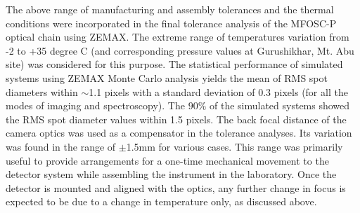 The above range of manufacturing and assembly tolerances and the thermal conditions were incorporated in the final tolerance analysis of the MFOSC-P optical chain using ZEMAX. The extreme range of temperatures variation from -2 to +35 degree C (and corresponding pressure values at Gurushikhar, Mt. Abu site) was considered for this purpose. The statistical performance of simulated systems using ZEMAX Monte Carlo analysis yields the mean of RMS spot diameters within $\sim$1.1 pixels with a standard deviation of 0.3 pixels (for all the modes of imaging and spectroscopy). The $90\%$ of the simulated systems showed the RMS spot diameter values within 1.5 pixels.  The back focal distance of the camera optics was used as a compensator in the tolerance analyses. Its variation was found in the range of $\pm$1.5mm for various cases. This range was primarily useful to provide arrangements for a one-time mechanical movement to the detector system while assembling the instrument in the laboratory. Once the detector is mounted and aligned with the optics, any further change in focus is expected to be due to a change in temperature only, as discussed above.
\par 

